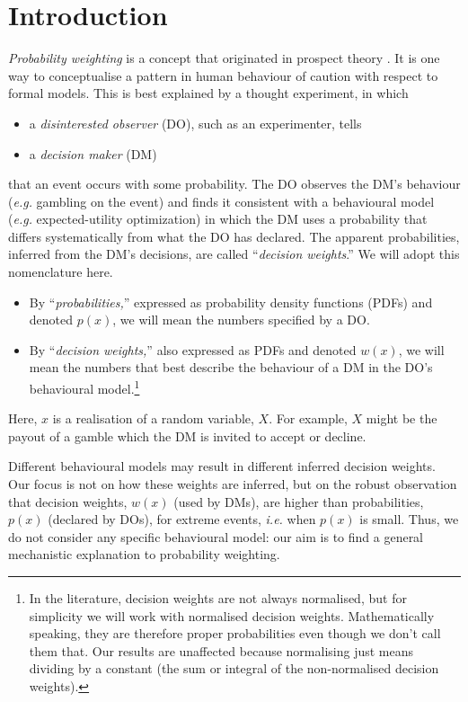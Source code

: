 \documentclass[%
	a4paper,
	abstract=true,	
	12pt,
	numbers=noenddot,
]{scrartcl}
\newcommand{\bi}{\begin{itemize}}
\newcommand{\ei}{\end{itemize}}
\newcommand{\ie}{\textit{i.e.}\xspace}
\newcommand{\eg}{\textit{e.g.}\xspace}
\begin{document}
\section{Introduction}
\textit{Probability weighting} is a concept that originated in prospect theory \parencite{KahnemanTversky1979,TverskyKahneman1992}. It is one way to conceptualise a pattern in human behaviour of caution with respect to formal models.
This is best explained by a thought experiment, in which  
\bi
	\item a \textit{disinterested observer} (DO), such as an experimenter, tells
	\item a \textit{decision maker} (DM)
\ei
that an event occurs with some probability. The DO observes the DM's behaviour (\eg gambling on the event) and finds it consistent with a behavioural model (\eg expected-utility optimization) in which the DM uses a probability that differs systematically from what the DO has declared. The apparent probabilities, inferred from the DM's decisions, are called ``\textit{decision weights}.'' We will adopt this nomenclature here.
% 
\bi
	\item By ``\textit{probabilities,}'' expressed as probability density functions (PDFs) and denoted $p(x)$, we will mean the numbers specified by a DO.
	\item By ``\textit{decision weights,}'' also expressed as PDFs and denoted $w(x)$, we will mean the numbers that best describe the behaviour of a DM in the DO's behavioural model.\footnote{In the literature, decision weights are not always normalised, but for simplicity we will work with normalised decision weights. Mathematically speaking, they are therefore proper probabilities even though we don't call them that. Our results are unaffected because normalising just means dividing by a constant (the sum or integral of the non-normalised decision weights).}
\ei
Here, $x$ is a realisation of a random variable, $X$. For example, $X$ might be the payout of a gamble which the DM is invited to accept or decline.

Different behavioural models may result in different inferred decision weights. Our focus is not on how these weights are inferred, but on the robust observation that decision weights, $w(x)$ (used by DMs), are higher than probabilities, $p(x)$ (declared by DOs), for extreme events, \ie when $p(x)$ is small. Thus, we do not consider any specific behavioural model: our aim is to find a general mechanistic explanation to probability weighting.
\end{document}
